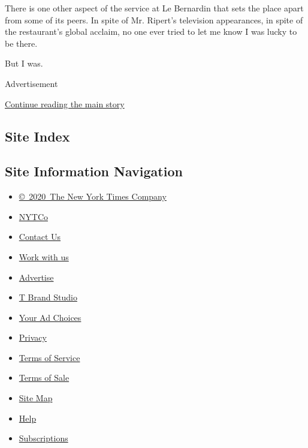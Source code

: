 There is one other aspect of the service at Le Bernardin that sets the
place apart from some of its peers. In spite of Mr. Ripert's television
appearances, in spite of the restaurant's global acclaim, no one ever
tried to let me know I was lucky to be there.

But I was.

Advertisement

\protect\hyperlink{after-bottom}{Continue reading the main story}

\hypertarget{site-index}{%
\subsection{Site Index}\label{site-index}}

\hypertarget{site-information-navigation}{%
\subsection{Site Information
Navigation}\label{site-information-navigation}}

\begin{itemize}
\tightlist
\item
  \href{https://help.nytimes3xbfgragh.onion/hc/en-us/articles/115014792127-Copyright-notice}{©~2020~The
  New York Times Company}
\end{itemize}

\begin{itemize}
\tightlist
\item
  \href{https://www.nytco.com/}{NYTCo}
\item
  \href{https://help.nytimes3xbfgragh.onion/hc/en-us/articles/115015385887-Contact-Us}{Contact
  Us}
\item
  \href{https://www.nytco.com/careers/}{Work with us}
\item
  \href{https://nytmediakit.com/}{Advertise}
\item
  \href{http://www.tbrandstudio.com/}{T Brand Studio}
\item
  \href{https://www.nytimes3xbfgragh.onion/privacy/cookie-policy\#how-do-i-manage-trackers}{Your
  Ad Choices}
\item
  \href{https://www.nytimes3xbfgragh.onion/privacy}{Privacy}
\item
  \href{https://help.nytimes3xbfgragh.onion/hc/en-us/articles/115014893428-Terms-of-service}{Terms
  of Service}
\item
  \href{https://help.nytimes3xbfgragh.onion/hc/en-us/articles/115014893968-Terms-of-sale}{Terms
  of Sale}
\item
  \href{https://spiderbites.nytimes3xbfgragh.onion}{Site Map}
\item
  \href{https://help.nytimes3xbfgragh.onion/hc/en-us}{Help}
\item
  \href{https://www.nytimes3xbfgragh.onion/subscription?campaignId=37WXW}{Subscriptions}
\end{itemize}
